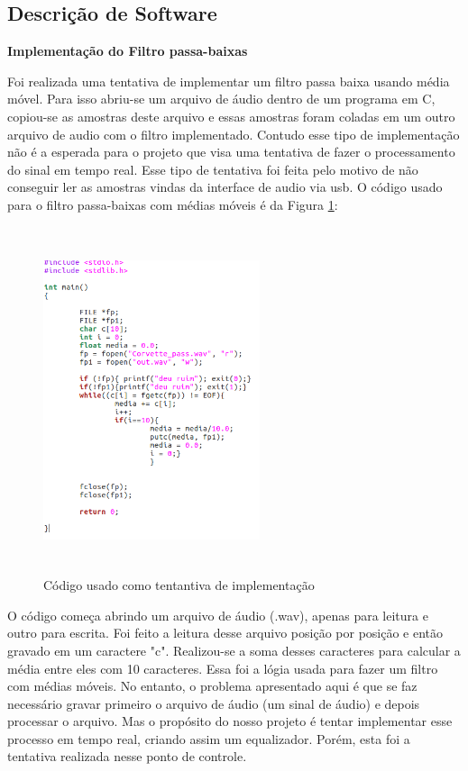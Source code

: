 \documentclass[conference]{IEEEtran}
\begin{document}
\subsection{Descrição de Software}

\begin{flushleft}

\textbf{Implementação do Filtro passa-baixas}
\end{flushleft}
 
Foi realizada uma tentativa de implementar um filtro passa baixa usando média móvel. Para isso abriu-se um arquivo de áudio dentro de um programa em C, copiou-se as amostras deste arquivo e essas amostras foram coladas em um outro arquivo de audio com o filtro implementado. 
Contudo esse tipo de implementação não é a esperada para o projeto que visa uma tentativa de fazer o processamento do sinal em tempo real. Esse tipo de tentativa foi feita pelo motivo de não conseguir ler as amostras vindas da  interface de audio via usb. O código usado para o filtro passa-baixas com médias móveis é da Figura \ref{codigo}:

\begin{figure}[!htb]
\centering
\includegraphics[width=2.5in, height=4in]{Imagens/vai}
\caption{Código usado como tentantiva de implementação} 
\label{codigo}
\end{figure}

O código começa abrindo um arquivo de áudio (.wav), apenas para leitura e outro para escrita. Foi feito a leitura desse arquivo posição por posição e então gravado em um caractere "c". Realizou-se a soma desses caracteres para calcular a média entre eles com 10 caracteres. 
Essa foi a lógia usada para fazer um filtro com médias móveis. No entanto, o problema apresentado aqui é que se faz necessário gravar primeiro o arquivo de áudio (um sinal de áudio) e depois processar o arquivo. Mas o propósito do nosso projeto é tentar implementar esse processo em tempo real, criando assim um equalizador. Porém, esta foi a tentativa realizada nesse ponto de controle.
\\
\end{document}
